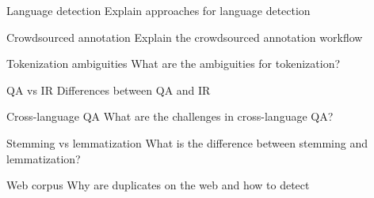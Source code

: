 \documentclass{article}
\begin{document}
\begin{exercise}{Language detection}
  Explain approaches for language detection

  \begin{solution}
  \end{solution}
\end{exercise}

\begin{exercise}{Crowdsourced annotation}
  Explain the crowdsourced annotation workflow

  \begin{solution}
  \end{solution}
\end{exercise}

\begin{exercise}{Tokenization ambiguities}
  What are the ambiguities for tokenization?

  \begin{solution}
  \end{solution}
\end{exercise}

\begin{exercise}{QA vs IR}
  Differences between QA and IR

  \begin{solution}
  \end{solution}
\end{exercise}

\begin{exercise}{Cross-language QA}
  What are the challenges in cross-language QA?

  \begin{solution}
  \end{solution}
\end{exercise}

\begin{exercise}{Stemming vs lemmatization}
  What is the difference between stemming and lemmatization?

  \begin{solution}
  \end{solution}
\end{exercise}

\begin{exercise}{Web corpus}
  Why are duplicates on the web and how to detect

  \begin{solution}
  \end{solution}
\end{exercise}
\end{document}
